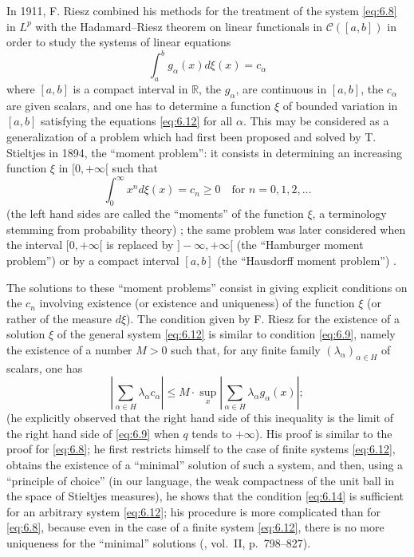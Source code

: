 \documentclass[12pt,a4paper,leqno,twoside]{extbook}
\newcommand{\Cont}{\mathcal{C}}
\newcommand{\R}{\mathbb{R}}
\begin{document}
In 1911, F. Riesz combined his methods for the treatment of the system \eqref{eq:6.8} in \(L^p\) with the Hadamard--Riesz theorem on linear functionals in \(\Cont([a,b])\) in order to study the systems of linear equations
\begin{equation}
    \label{eq:6.12}
    \int_a^b g_\alpha(x)d\xi(x) = c_\alpha
\end{equation}
where \([a,b]\) is a compact interval in \(\R\), the \(g_\alpha\), are continuous in \([a,b]\), the \(c_\alpha\) are given scalars, and one has to determine a function \(\xi\) of bounded variation in \([a,b]\) satisfying the equations \eqref{eq:6.12} for all \(\alpha\). This may be considered as a generalization of a problem which had first been proposed and solved by T. Stieltjes in 1894, the ``moment problem'': it consists in determining an increasing function \(\xi\) in \([0,+\infty[\) such that
\begin{equation}
    \label{eq:6.13}
    \int_0^\infty x^n d\xi(x) = c_n \geq 0 \quad \text{for } n = 0,1,2,\ldots
\end{equation}
(the left hand sides are called the ``moments'' of the function \(\xi\), a terminology stemming from probability theory) \cite{205}; the same problem was later considered when the interval \([0,+\infty[\) is replaced by \(]-\infty, +\infty[\) (the ``Hamburger moment problem'') or by a compact interval \([a,b]\) (the ``Hausdorff moment problem'') \cite{003}.

The solutions to these ``moment problems'' consist in giving explicit conditions on the \(c_n\) involving existence (or existence and uniqueness) of the function \(\xi\) (or rather of the measure \(d\xi\)). The condition given by F. Riesz for the existence of a solution \(\xi\) of the general system \eqref{eq:6.12} is similar to condition \eqref{eq:6.9}, namely the existence of a number \(M > 0\) such that, for any finite family \((\lambda_\alpha)_{\alpha \in H}\) of scalars, one has
\begin{equation}
    \label{eq:6.14}
    \left| \sum_{\alpha \in H} \lambda_\alpha c_\alpha \right| \leq M \cdot \sup_x \left| \sum_{\alpha \in H} \lambda_\alpha g_\alpha(x) \right|;
\end{equation}
(he explicitly observed that the right hand side of this inequality is the limit of the right hand side of \eqref{eq:6.9} when \(q\) tends to \(+\infty\)). His proof is similar to the proof for \eqref{eq:6.8}; he first restricts himself to the case of finite systems \eqref{eq:6.12}, obtains the existence of a ``minimal'' solution of such a system, and then, using a ``principle of choice'' (in our language, the weak compactness of the unit ball in the space of Stieltjes measures), he shows that the condition \eqref{eq:6.14} is sufficient for an arbitrary system  \eqref{eq:6.12}; his procedure is more complicated than for  \eqref{eq:6.8}, because even in the case of a finite system \eqref{eq:6.12}, there is no more uniqueness for the ``minimal'' solutions (\cite{183}, vol.~II, p.~798--827).
\end{document}
